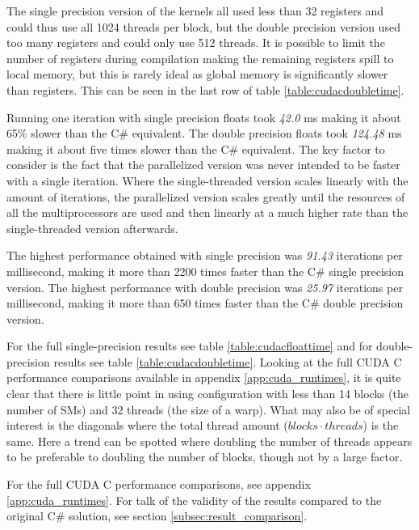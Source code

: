 The single precision version of the kernels all used less than 32 registers and could thus use all 1024 threads per block, but the double precision version used too many registers and could only use 512 threads. 
It is possible to limit the number of registers during compilation making the remaining registers spill to local memory, but this is rarely ideal as global memory is significantly slower than registers.
This can be seen in the last row of table \ref{table:cudacdoubletime}.

Running one iteration with single precision floats took \emph{42.0} ms making it about 65\% slower than the C\# equivalent.
The double precision floats took \emph{124.48} ms making it about five times slower than the C\# equivalent.
The key factor to consider is the fact that the parallelized version was never intended to be faster with a single iteration.
Where the single-threaded version scales linearly with the amount of iterations, the parallelized version scales greatly until the resources of all the multiprocessors are used and then linearly at a much higher rate than the single-threaded version afterwards.

The highest performance obtained with single precision was \emph{91.43} iterations per millisecond, making it more than 2200 times faster than the C\# single precision version.
The highest performance with double precision was \emph{25.97} iterations per millisecond, making it more than 650 times faster than the C\# double precision version.

For the full single-precision results see table \ref{table:cudacfloattime} and for double-precision results see table \ref{table:cudacdoubletime}.
Looking at the full CUDA C performance comparisons available in appendix \ref{app:cuda_runtimes}, it is quite clear that there is little point in using configuration with less than 14 blocks (the number of SMs) and 32 threads (the size of a warp).
What may also be of special interest is the diagonals where the total thread amount ($blocks \cdot threads$) is the same.
Here a trend can be spotted where doubling the number of threads appears to be preferable to doubling the number of blocks, though not by a large factor.

For the full CUDA C performance comparisons, see appendix \ref{app:cuda_runtimes}.
For talk of the validity of the results compared to the original C\# solution, see section \ref{subsec:result_comparison}.

